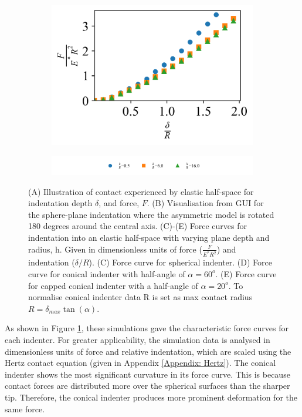 \begin{figure}[H]
\begin{subfigure}[t]{0.32\textwidth}
        \includegraphics[width=1\linewidth]{Figures/Capped-Plane-Force_Curve-Indenter.png}
    \end{subfigure}

    \hfill
    
    \begin{subfigure}[t]{1\textwidth}
        \includegraphics[width=1\linewidth]{Figures/Planes-Force_Curve-Legend.png}
    \end{subfigure}
    
    \caption{\label{fig: Force_Curve-Planes}(A) Illustration of contact experienced by elastic half-space for indentation depth $\delta$, and force, $F$. (B) Visualisation from  GUI for the sphere-plane indentation where the asymmetric model is rotated 180 degrees around the central axis. (C)-(E) Force curves for indentation into an elastic half-space with varying plane depth and radius, h. Given in dimensionless units of force ($\frac{F}{E^*R^2}$) and indentation ($\delta/R$). (C) Force curve for spherical indenter. (D) Force curve for conical indenter with half-angle of $\alpha = 60^o$. (E) Force curve for capped conical indenter with a half-angle of $\alpha = 20^o$. To normalise conical indenter data R is set as max contact radius $R=\delta_{max}\tan(\alpha)$. } 
    
\end{figure}

As shown in Figure \ref{fig: Force_Curve-Planes}, these simulations gave the characteristic force curves for each indenter. For greater applicability, the simulation data is analysed in dimensionless units of force and relative indentation, which are scaled using the Hertz contact equation (given in Appendix \ref{Appendix: Hertz}). The conical indenter shows the most significant curvature in its force curve. This is because contact forces are distributed more over the spherical surfaces than the sharper tip. Therefore, the conical indenter produces more prominent deformation for the same force.  

